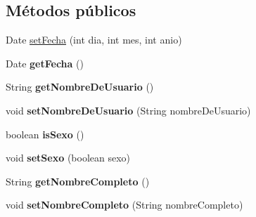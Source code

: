 \subsection*{Métodos públicos}
\begin{DoxyCompactItemize}
\item 
Date \hyperlink{classcom_1_1ucab_1_1javachat_1_1_servidor_1_1model_1_1_usuario_a67f151ed25f6ca94c56acd260ac09a69}{set\-Fecha} (int dia, int mes, int anio)
\item 
\hypertarget{classcom_1_1ucab_1_1javachat_1_1_servidor_1_1model_1_1_usuario_ad08163d55a8c2614eaa16dafcab8964a}{Date {\bfseries get\-Fecha} ()}\label{classcom_1_1ucab_1_1javachat_1_1_servidor_1_1model_1_1_usuario_ad08163d55a8c2614eaa16dafcab8964a}

\item 
\hypertarget{classcom_1_1ucab_1_1javachat_1_1_servidor_1_1model_1_1_usuario_a52fa249d62eff30d8466b14f7422b774}{String {\bfseries get\-Nombre\-De\-Usuario} ()}\label{classcom_1_1ucab_1_1javachat_1_1_servidor_1_1model_1_1_usuario_a52fa249d62eff30d8466b14f7422b774}

\item 
\hypertarget{classcom_1_1ucab_1_1javachat_1_1_servidor_1_1model_1_1_usuario_a80796a87691a85cb47442b420aabd004}{void {\bfseries set\-Nombre\-De\-Usuario} (String nombre\-De\-Usuario)}\label{classcom_1_1ucab_1_1javachat_1_1_servidor_1_1model_1_1_usuario_a80796a87691a85cb47442b420aabd004}

\item 
\hypertarget{classcom_1_1ucab_1_1javachat_1_1_servidor_1_1model_1_1_usuario_a64cf2949f9c329b09c802f9f74325b21}{boolean {\bfseries is\-Sexo} ()}\label{classcom_1_1ucab_1_1javachat_1_1_servidor_1_1model_1_1_usuario_a64cf2949f9c329b09c802f9f74325b21}

\item 
\hypertarget{classcom_1_1ucab_1_1javachat_1_1_servidor_1_1model_1_1_usuario_a77f06fad76898b3b42d440bf9b6e3297}{void {\bfseries set\-Sexo} (boolean sexo)}\label{classcom_1_1ucab_1_1javachat_1_1_servidor_1_1model_1_1_usuario_a77f06fad76898b3b42d440bf9b6e3297}

\item 
\hypertarget{classcom_1_1ucab_1_1javachat_1_1_servidor_1_1model_1_1_usuario_a65aa2651b1681f4ef2d8a03c1fc5a9d4}{String {\bfseries get\-Nombre\-Completo} ()}\label{classcom_1_1ucab_1_1javachat_1_1_servidor_1_1model_1_1_usuario_a65aa2651b1681f4ef2d8a03c1fc5a9d4}

\item 
\hypertarget{classcom_1_1ucab_1_1javachat_1_1_servidor_1_1model_1_1_usuario_a5450b7564eae85749988170bc27e9f4b}{void {\bfseries set\-Nombre\-Completo} (String nombre\-Completo)}\label{classcom_1_1ucab_1_1javachat_1_1_servidor_1_1model_1_1_usuario_a5450b7564eae85749988170bc27e9f4b}


\end{DoxyCompactItemize}
